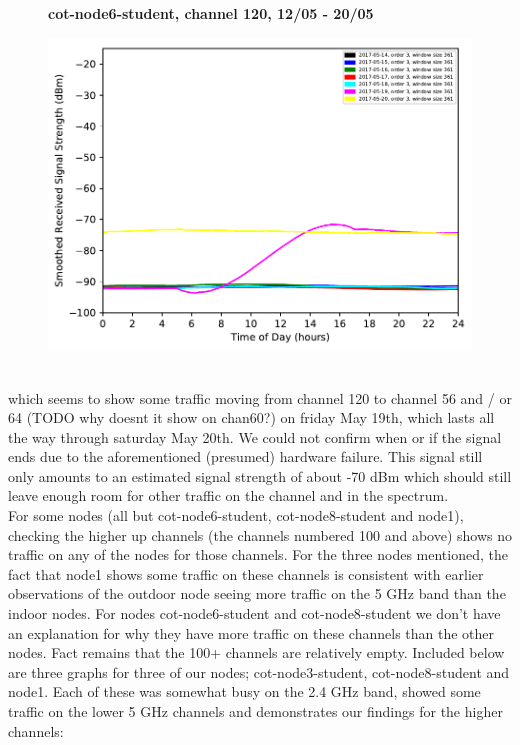 \begin{figure}[h!]
    \centering
    \textbf{cot-node6-student, channel 120, 12/05 - 20/05}\par\medskip
	\includegraphics[scale=0.5]{images/5_GHz/cot-node6-student_2017-05-20_chan64_image.pdf}
\end{figure}\\
which seems to show some traffic moving from channel 120 to channel 56 and / or 64 (TODO why doesnt it show on chan60?) on friday May 19th, which lasts all the way through saturday May 20th. We could not confirm when or if the signal ends due to the aforementioned (presumed) hardware failure. This signal still only amounts to an estimated signal strength of about -70 dBm which should still leave enough room for other traffic on the channel and in the spectrum.\\
For some nodes (all but cot-node6-student, cot-node8-student and node1), checking the higher up channels (the channels numbered 100 and above) shows no traffic on any of the nodes for those channels. For the three nodes mentioned, the fact that node1 shows some traffic on these channels is consistent with earlier observations of the outdoor node seeing more traffic on the 5 GHz band than the indoor nodes. For nodes cot-node6-student and cot-node8-student we don't have an explanation for why they have more traffic on these channels than the other nodes. Fact remains that the 100+ channels are relatively empty.
Included below are three graphs for three of our nodes; cot-node3-student, cot-node8-student and node1. Each of these was somewhat busy on the 2.4 GHz band, showed some traffic on the lower 5 GHz channels and demonstrates our findings for the higher channels:
